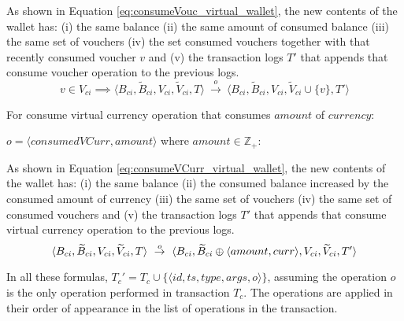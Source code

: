 \begin{enumerate}
	As shown in Equation \ref{eq:consumeVouc_virtual_wallet}, the new contents of the wallet has: (i) the same balance (ii) the same amount of consumed balance (iii) the same set of vouchers (iv) the set consumed vouchers together with that recently consumed voucher $v$ and (v) the transaction logs $T'$ that appends that consume voucher operation to the previous logs.		
	\begin{equation} \label{eq:consumeVouc_virtual_wallet}
		 v \in V_{ci} \implies 
	    \langle B_{ci}, \widetilde{B}_{ci}, V_{ci}, \widetilde{V}_{ci}, T \rangle ~ \overset{o}{\rightarrow} 
	     ~ \langle B_{ci}, \widetilde{B}_{ci}, V_{ci}, \widetilde{V}_{ci} \cup \{v\}, T' \rangle 	
	\end{equation}
	
	For consume virtual currency operation that consumes $amount$ of $currency$:
	\begin{center}
		$o = \langle consumedVCurr, amount \rangle$ where $amount \in \mathbb{Z}_{+}$:
	\end{center}
	
	As shown in Equation \ref{eq:consumeVCurr_virtual_wallet}, the new contents of the wallet has: (i) the same balance (ii) the consumed balance increased by the consumed amount of currency (iii) the same set of vouchers (iv) the same set of consumed vouchers and (v) the transaction logs $T'$ that appends that consume virtual currency operation to the previous logs.
	\begin{equation} \label{eq:consumeVCurr_virtual_wallet}
	    \langle B_{ci}, \widetilde{B}_{ci}, V_{ci}, \widetilde{V}_{ci}, T \rangle ~ \overset{o}{\rightarrow} \\
	    ~ \langle B_{ci}, \widetilde{B}_{ci} \oplus \langle amount, curr \rangle, V_{ci}, \widetilde{V}_{ci}, T' \rangle 	
	\end{equation}
	
	In all these formulas, $T_{c}'=T_{c} \cup \{ \langle id, ts, type, args, o \rangle \}$, assuming the operation $o$ is the only operation performed in transaction $T_{c}$. The operations are applied in their order of appearance in the list of operations in the transaction.
\end{enumerate}
